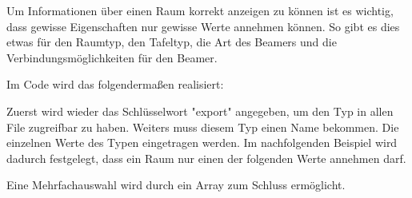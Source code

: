 
Um Informationen über einen Raum korrekt anzeigen zu können ist es wichtig, dass gewisse Eigenschaften nur gewisse Werte annehmen können. So gibt es dies etwas für den Raumtyp, den Tafeltyp, die Art des Beamers und die Verbindungsmöglichkeiten für den Beamer.

Im Code wird das folgendermaßen realisiert:

Zuerst wird wieder das Schlüsselwort "export" angegeben, um den Typ in allen File zugreifbar zu haben. Weiters muss diesem Typ einen Name bekommen. Die einzelnen Werte des Typen eingetragen werden. Im nachfolgenden Beispiel wird dadurch festgelegt, dass ein Raum nur einen der folgenden Werte annehmen darf.


Eine Mehrfachauswahl wird durch ein Array zum Schluss ermöglicht.

